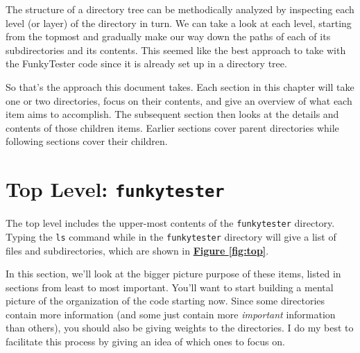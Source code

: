 \documentclass{report}
\begin{document}
The structure of a directory tree can be methodically analyzed by inspecting each level (or layer) of the directory in turn. We can take a look at each level, starting from the topmost and gradually make our way down the paths of each of its  subdirectories and its contents. This seemed like the best approach to take with the FunkyTester code since it is already set up in a directory tree.

So that's the approach this document takes. Each section in this chapter will take one or two directories, focus  on their contents, and give an overview of what each item aims to accomplish. The subsequent section then looks at the details and contents of those children items. Earlier sections cover parent directories while following sections cover their children.

\section{Top Level: \texttt{funkytester}}
The top level includes the upper-most contents of the \texttt{funkytester} directory. Typing the \texttt{ls} command while in the \texttt{funkytester} directory will give a list of files and subdirectories, which are shown in \hyperref[fig:top]{\textbf{Figure \ref{fig:top}}}.\\
	\begin{minipage}{\linewidth}
		\label{fig:top}
	\end{minipage} 
\vspace{5pt}%


In this section, we'll look at the bigger picture purpose of these items, listed in sections from least to most important. You'll want to start building a mental picture of the organization of the code starting now. Since some directories contain more information (and some just contain more \textit{important} information than others), you should also be giving weights to the directories. I do my best to facilitate this process by giving an idea of which ones to focus on.
\end{document}
